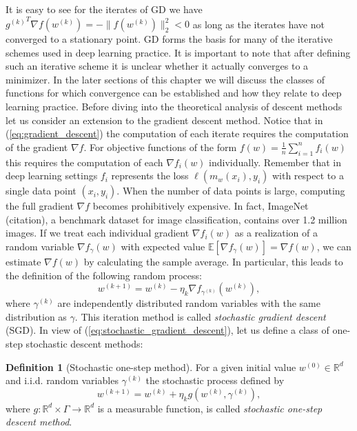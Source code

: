 \documentclass[12pt]{article}
\theoremstyle{definition}
\newtheorem{definition}[theorem]{Definition}
\numberwithin{equation}{section}
\newcommand{\ev}[1]{\mathbb{E}\left[{#1}\right]}
\newcommand{\norm}[1]{\lVert{#1}\rVert_2}
\begin{document}
It is easy to see for the iterates of GD we have ${g^{(k)}}^T \nabla f(w^{(k)}) = -\norm{ f(w^{(k)}) }^2 < 0$ as long as the iterates have not converged to a stationary point. GD forms the basis for many of the iterative schemes used in deep learning practice. It is important to note that after defining such an iterative scheme it is unclear whether it actually converges to a minimizer. In the later sections of this chapter we will discuss the classes of functions for which convergence can be established and how they relate to deep learning practice. Before diving into the theoretical analysis of descent methods let us consider an extension to the gradient descent method.
Notice that in (\ref{eq:gradient_descent}) the computation of each iterate requires the computation of the gradient $\nabla f$. For objective functions of the form $f(w) = \frac{1}{n} \sum_{i=1}^n f_i(w)$ this requires the computation of each $\nabla f_i(w)$ individually. Remember that in deep learning settings $f_i$ represents the loss $\ell(m_w(x_i), y_i)$ with respect to a single data point $(x_i, y_i)$. When the number of data points is large, computing the full gradient $\nabla f$ becomes prohibitively expensive. In fact, ImageNet (citation), a benchmark dataset for image classification, contains over 1.2 million images. If we treat each individual gradient $\nabla f_i(w)$ as a realization of a random variable $\nabla f_{\gamma}(w)$ with expected value $\ev{\nabla f_{\gamma}(w)} = \nabla f(w)$, we can estimate $\nabla f(w)$ by calculating the sample average. In particular, this leads to the definition of the following random process:
\begin{equation}
  \label{eq:stochastic_gradient_descent}
  w^{(k+1)} = w^{(k)} - \eta_k \nabla f_{\gamma^{(k)}}(w^{(k)}),
\end{equation}
where $\gamma^{(k)}$ are independently distributed random variables with the same distribution as $\gamma$. This iteration method is called \emph{stochastic gradient descent} (SGD).
In view of (\ref{eq:stochastic_gradient_descent}), let us define a class of one-step stochastic descent methods:
\begin{definition}[Stochastic one-step method]
  For a given initial value $w^{(0)} \in \mathbb{R}^d$ and i.i.d. random variables $\gamma^{(k)}$ the stochastic process defined by
\begin{equation}
  w^{(k+1)} = w^{(k)} + \eta_k g(w^{(k)}, \gamma^{(k)}),
\end{equation}
  where $g:\mathbb{R}^d \times \Gamma \rightarrow \mathbb{R}^d$ is a measurable function, is called \emph{stochastic one-step descent method}.
\end{definition}
\end{document}
